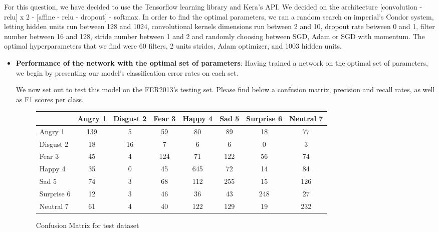 For this question, we have decided to use the Tensorflow learning library and Kera's API.
We decided on the architecture [convolution - relu] x 2 - [affine - relu - dropout] - softmax.
In order to find the optimal parameters, we ran a random search on imperial's Condor system,
letting hidden units run between 128 and 1024, convolutional kernels dimensions run between 2 and 10, dropout rate between 0 and 1,
filter number between 16 and 128, stride number between 1 and 2 and randomly choosing between SGD, Adam or SGD with momentum.
The optimal hyperparameters that we find were 60 filters, 2 units strides, Adam optimizer, and 1003 hidden units.
\begin{itemize}

\item \textbf{Performance of the network with the optimal set of parameters}:
  Having trained a network on the optimal set of parameters,
  we begin by presenting our model's classification error rates on each set.
  
  We now set out to test this model on the FER2013's testing set.
  Please find below a confusion matrix, precision and recall rates, as well as F1 scores per class.
  \begin{figure}[h]
  \begin{center}
    \caption{Confusion Matrix for test dataset}
    \begin{tabular}{ | l || c | c | c | c | c | c | c |}
    \hline
          & Angry 1 & Disgust 2 & Fear 3 & Happy 4 & Sad 5 & Surprise 6 & Neutral 7 \\ \hline \hline
        Angry 1 & 139 & 5 & 59 & 80 & 89 & 18 & 77 \\ \hline
        Disgust 2 & 18 & 16 & 7 & 6 & 6 & 0 & 3 \\ \hline
        Fear 3 & 45 & 4 & 124 & 71 & 122 & 56 & 74 \\ \hline
        Happy 4 & 35 & 0 & 45 & 645 & 72 & 14 & 84 \\ \hline
        Sad 5 & 74 & 3 & 68 & 112 & 255 & 15 & 126 \\ \hline
        Surprise 6 & 12 & 3 & 46 & 36 & 43 & 248 & 27 \\ \hline
        Neutral 7 & 61 & 4 & 40 & 122 & 129 & 19 & 232 \\ \hline
    \end{tabular}
    \label{fig:confusionMatrix}
\end{center}
\end{figure}


\end{itemize}
